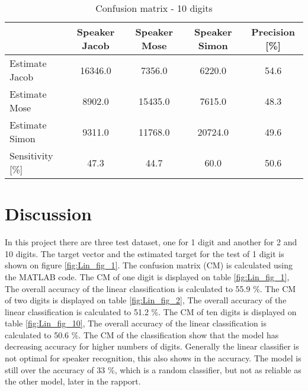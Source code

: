 \begin{table}[H]                                                    
\centering                                                          
\begin{tabular}{|l|c|c|c|c|}                                        
\hline                                                              
  & Speaker Jacob & Speaker Mose & Speaker Simon & Precision [\%] \\
\hline                                                              
Estimate Jacob & 16346.0 & 7356.0 & 6220.0 & 54.6 \\                
\hline                                                              
Estimate Mose & 8902.0 & 15435.0 & 7615.0 & 48.3 \\                 
\hline                                                              
Estimate Simon & 9311.0 & 11768.0 & 20724.0 & 49.6 \\               
\hline                                                              
Sensitivity [\%] & 47.3 & 44.7 & 60.0 & 50.6 \\                     
\hline                                                              
\end{tabular}                                                       
\caption{Confusion matrix - 10 digits}                              
\label{table:Lin_conf_10}                                           
\end{table}                                     


\section{Discussion}
In this project there are three test dataset, one for 1 digit and another for 2 and 10 digits.
The target vector and the estimated target for the test of 1 digit is shown on figure \ref{fig:Lin_fig_1}.
The confusion matrix (CM) is calculated using the MATLAB code. 
The CM of one digit is displayed on table \ref{fig:Lin_fig_1}, The overall accuracy of the linear classification is  calculated to 55.9 \%.
The CM of two digits is displayed on table \ref{fig:Lin_fig_2}, The overall accuracy of the linear classification is  calculated to 51.2 \%.
The CM of ten digits is displayed on table \ref{fig:Lin_fig_10}, The overall accuracy of the linear classification is  calculated to 50.6 \%.
The CM of the classification show that the model has decreasing accuracy for higher numbers of digits.
Generally the linear classifier is not optimal for speaker recognition, this also shows in the accuracy. 
The model is still over the accuracy of 33 \%, which is a random classifier, but not as reliable as the other model, later in the rapport. 
